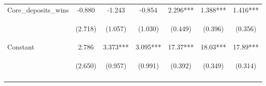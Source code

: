 \begin{tabular}{lcccccc}
Core\_deposits\_wins & -0.880 & -1.243 & -0.854 & 2.296*** & 1.388*** & 1.416*** \\
\vspace{4pt} & \begin{footnotesize}(2.718)\end{footnotesize} & \begin{footnotesize}(1.057)\end{footnotesize} & \begin{footnotesize}(1.030)\end{footnotesize} & \begin{footnotesize}(0.449)\end{footnotesize} & \begin{footnotesize}(0.396)\end{footnotesize} & \begin{footnotesize}(0.356)\end{footnotesize} \\
Constant & 2.786 & 3.373*** & 3.095*** & 17.37*** & 18.03*** & 17.89*** \\
 & \begin{footnotesize}(2.650)\end{footnotesize} & \begin{footnotesize}(0.957)\end{footnotesize} & \begin{footnotesize}(0.991)\end{footnotesize} & \begin{footnotesize}(0.392)\end{footnotesize} & \begin{footnotesize}(0.349)\end{footnotesize} & \begin{footnotesize}(0.314)\end{footnotesize} \\
\vspace{4pt} & \begin{footnotesize}\end{footnotesize} & \begin{footnotesize}\end{footnotesize} & \begin{footnotesize}\end{footnotesize} & \begin{footnotesize}\end{footnotesize} & \begin{footnotesize}\end{footnotesize} & \begin{footnotesize}\end{footnotesize} \\

\end{tabular}
